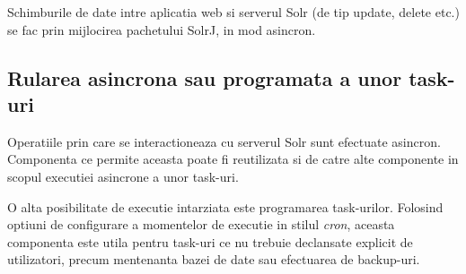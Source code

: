 Schimburile de date intre aplicatia web si serverul Solr (de tip update, delete
etc.) se fac prin mijlocirea pachetului SolrJ, in mod asincron.

\subsection{Rularea asincrona sau programata a unor task-uri}
Operatiile prin care se interactioneaza cu serverul Solr sunt efectuate
asincron.
Componenta ce permite aceasta poate fi reutilizata si de catre alte
componente in scopul executiei asincrone a unor task-uri.

O alta posibilitate de executie intarziata este programarea task-urilor.
Folosind optiuni de configurare a momentelor de executie in stilul \emph{cron},
aceasta componenta este utila pentru task-uri ce nu trebuie declansate explicit de
utilizatori, precum mentenanta bazei de date sau efectuarea de backup-uri.

